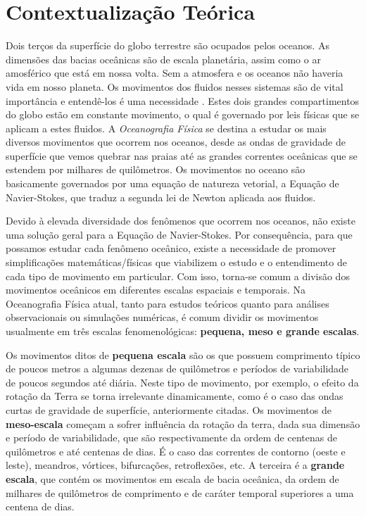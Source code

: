 \section{Contextualização Teórica}\label{sec:int}

\hspace{6mm} Dois terços da superfície do globo terrestre são ocupados pelos oceanos. 
As dimensões das bacias oceânicas são de escala planetária, 
assim como o ar amosférico que está em nossa volta. Sem a atmosfera e os oceanos não haveria
vida em nosso planeta. Os movimentos dos fluidos nesses sistemas são de vital importância e entendê-los
é uma necessidade \citep{cushman1994}. Estes dois grandes compartimentos 
do globo estão em constante movimento, o qual é governado por leis 
físicas que se aplicam a estes fluidos. A {\it Oceanografia 
Física} se destina a estudar os mais
diversos movimentos que ocorrem nos oceanos, desde as ondas de gravidade de superfície que vemos quebrar nas praias até 
as grandes correntes oceânicas que se estendem por milhares de quilômetros. Os movimentos no oceano
são basicamente governados por uma equação de natureza vetorial, a Equação de Navier-Stokes, que traduz a
segunda lei de Newton aplicada aos fluidos.

Devido à elevada diversidade dos
fenômenos que ocorrem nos oceanos, não existe uma solução geral para a Equação de Navier-Stokes.
 Por consequência, para que possamos estudar cada fenômeno oceânico, existe a necessidade de promover
sim\-pli\-fi\-ca\-ções matemáticas/físicas que viabilizem o estudo e o entendimento de cada tipo de movimento em particular. 
Com isso, torna-se comum a divisão dos movimentos oceânicos em diferentes escalas
espaciais e temporais. Na Oceanografia Física atual, tanto para estudos teóricos quanto 
para análises observacionais ou simulações numéricas, é comum dividir os movimentos 
usualmente em três escalas fe\-no\-me\-no\-ló\-gi\-cas: {\bf pequena, meso e grande escalas}. 

Os movimentos ditos de {\bf pequena escala} são os que possuem comprimento típico de poucos
metros a algumas dezenas de quilômetros e períodos de variabilidade de poucos segundos
até diária. Neste tipo de movimento, por exemplo, o efeito da rotação da Terra
se torna irrelevante dinamicamente, como é o caso das ondas curtas de gravidade de superfície, anteriormente citadas. 
Os movimentos de {\bf meso-escala} começam a sofrer influência da rotação da terra, dada
sua dimensão e período de variabilidade, que são respectivamente da ordem de centenas
de quilômetros e até centenas de dias. É o caso das correntes de contorno (oeste e leste), meandros, 
vórtices, bifurcações, retroflexões, etc. A terceira é a {\bf grande escala}, que 
contém os movimentos em escala de bacia oceânica, da ordem de milhares de quilômetros de 
comprimento e de caráter temporal superiores a uma centena de dias. 

